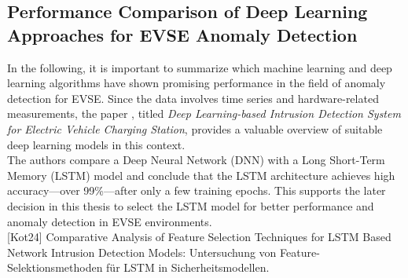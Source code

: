 \subsection{Performance Comparison of Deep Learning Approaches for EVSE Anomaly Detection}

In the following, it is important to summarize which machine learning and deep learning algorithms have shown promising performance in the field of anomaly detection for EVSE. Since the data involves time series and hardware-related measurements, the paper \cite{deeplearing_compare_EVSE}, titled \textit{Deep Learning-based Intrusion Detection System for Electric Vehicle Charging Station}, provides a valuable overview of suitable deep learning models in this context.\\
The authors compare a Deep Neural Network (DNN) with a Long Short-Term Memory (LSTM) model and conclude that the LSTM architecture achieves high accuracy—over 99\%—after only a few training epochs. This supports the later decision in this thesis to select the LSTM model for better performance and anomaly detection in EVSE environments.\\

[Kot24] Comparative Analysis of Feature Selection Techniques for LSTM Based Network Intrusion Detection Models: Untersuchung von Feature-Selektionsmethoden für LSTM in Sicherheitsmodellen.